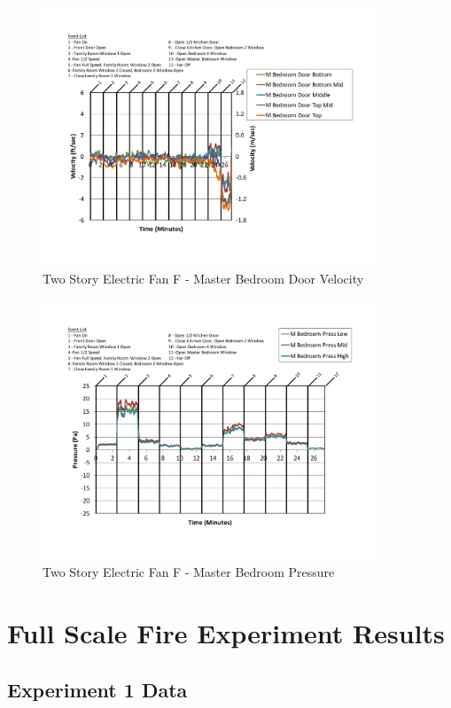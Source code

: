 \documentclass{article}
\begin{document}
\begin{appendices}
	\begin{figure}[H]
		\centering
		\includegraphics[height=3.05in,trim=0.67in 1.1in 0.67in 0.8in,clip=true]{0_Images/Results_Charts/ColdFlow/Two_Story/Electric/F/Master_Bedroom_Door_Velocity.pdf}
		\caption{Two Story Electric Fan F - Master Bedroom Door Velocity}
	\end{figure}
 

	\begin{figure}[H]
		\centering
		\includegraphics[height=3.05in,trim=0.67in 1.1in 0.67in 0.8in,clip=true]{0_Images/Results_Charts/ColdFlow/Two_Story/Electric/F/Master_Bedroom_Pressure.pdf}
		\caption{Two Story Electric Fan F - Master Bedroom Pressure}
	\end{figure}
 
	\clearpage

\section{Full Scale Fire Experiment Results} \label{App:Results}

\subsection{Experiment 1 Data} \label{App:Exp1Results} 


\end{appendices}
\end{document}
